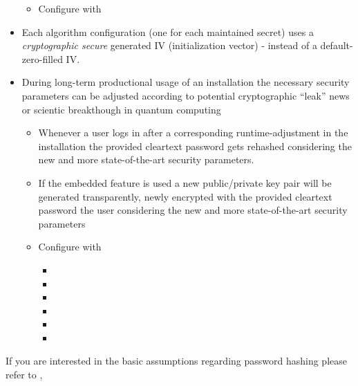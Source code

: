 \begin{itemize}
		\begin{itemize}
			\item Configure with 
		\end{itemize}
	\item Each algorithm configuration (one for each maintained secret) uses a \textit{cryptographic secure} generated IV (initialization vector) - instead of a default-zero-filled IV.
	\item During long-term productional usage of an \AMBETH{} installation the necessary security parameters can be adjusted according to potential cryptographic ``leak'' news or scientic breakthough in quantum computing
		\begin{itemize}
			\item Whenever a user logs in after a corresponding runtime-adjustment in the \AMBETH{} installation the provided cleartext password gets rehashed considering the new and more state-of-the-art security parameters.
			\item If the embedded  feature is used a new public/private key pair will be generated transparently, newly encrypted with the provided cleartext password the user considering the new and more state-of-the-art security parameters
			\item Configure with
				\begin{itemize}
					\item {}
					\item {}
					\item {}
					\item {}
					\item {}
					\item {}
				\end{itemize}	
		\end{itemize}	
\end{itemize}

If you are interested in the basic assumptions regarding password hashing please refer to \cite{lka01}, 


